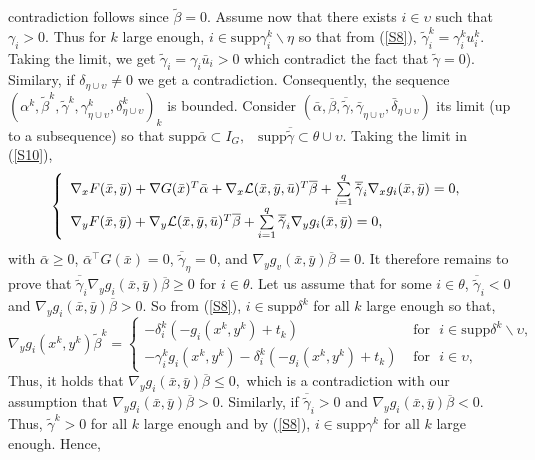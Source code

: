 	contradiction follows since $\tilde{\beta}=0$. Assume now that there
	exists $i\in\upsilon$ such that $\gamma_{i}>0.$ Thus for $k$ large enough,
	$i\in\mathrm{supp}\gamma_{i}^{k}\backslash\eta$ so that from (\ref{S8}),
	$\tilde{\gamma}_{i}^{k}= \gamma_{i}^{k}u_{i}^{k}$.  Taking the limit, we get $\tilde{\gamma}_{i}=\gamma _{i}\bar{u}_{i} > 0$  which contradict the fact that  $\tilde{\gamma}=0$).
	Similary, if
	$\delta_{\eta\cup\upsilon}\neq0$ we get a contradiction.
	Consequently, the sequence $(
	\alpha^{k},\tilde{\beta}^{k},\tilde{\gamma}^{k},\gamma
	_{\eta\cup\upsilon}^{k},\delta
	_{\eta\cup\upsilon}^{k})_{k}$ is bounded.
	Consider $(\bar{\alpha},\overline{\beta},\overline{\tilde{\gamma}},\bar{\gamma}_{\eta\cup\upsilon},\bar{\delta}_{\eta\cup\upsilon})$ its limit (up to a
	subsequence) so that 
	$
	\mathrm{supp}\bar{\alpha}\subset I_{G},\text{ }\, \mathrm{supp}\overline{\tilde{\gamma}
	}\subset\theta\cup\upsilon.
	$
	Taking the limit in (\ref{S10}), 
	\[
	\left\{
	\begin{array}{l}
	\nabla_{x}F(\bar{x},\bar{y})+\nabla G(\bar{x})^{T}\bar{\alpha}+\nabla
	_{x}\mathcal{L}(\bar{x},\bar{y},\bar{u})^{T}\overline{\beta}+\sum
	\limits_{i=1}^{q}\overline{\tilde{\gamma}}_{i}\nabla_{x}g_{i}(\bar{x},\bar
	{y})=0,\\[1ex]
	\multicolumn{1}{l}{\nabla_{y}F(\bar{x},\bar{y})+\nabla_{y}\mathcal{L}(\bar
		{x},\bar{y},\bar{u})^{T}\overline{\beta}+\sum\limits_{i=1}^{q}\overline
		{\tilde{\gamma}}_{i}\nabla_{y}g_{i}(\bar{x},\bar{y})=0,}
	\end{array}
	\right.
	\]
	with $\bar{\alpha}\geq0$, $\bar{\alpha}^\top G(\bar{x})=0$, $\overline{\tilde{\gamma}}_{\eta}=0$, and $\nabla_{y}g_{v}(\bar
	{x},\bar{y})\overline{\beta}=0$. 	
	It therefore remains to prove that $\overline{\tilde{\gamma}}_{i}\nabla_{y}g_{i}(\bar
	{x},\bar{y})\overline{\beta}\geq0$ for $i\in\theta.$ Let us assume that for
	some $i\in\theta$,
	$\overline{\tilde{\gamma}}_{i}<0$ and $\nabla_{y}g_{i} (\bar{x},\bar{y})\overline{\beta}>0.$
	So from (\ref{S8}), $i\in\mathrm{supp}\delta^{k}$ for all $k$
	large enough so that,
	\begin{equation}
	\nabla_{y}g_{i}(x^{k},y^{k})\tilde{\beta}^{k}=\left\{
	\begin{array}{lll}
	
	-\delta _{i}^{k}(-g_{i}(x^{k},y^{k})+t_{k})& \mbox{ for }\,\, i\in\mathrm{supp}\delta^{k}\backslash\upsilon,& \\
	-\gamma
	_{i}^{k}g_{i}(x^{k},y^{k})-\delta _{i}^{k}(-g_{i}(x^{k},y^{k})+t_{k})  & \mbox{ for }\,\,  i\in \upsilon,&
	\end{array}
	\right.
	\end{equation}
		Thus, it holds that
	$
	\nabla_{y}g_{i}(\bar{x},\bar{y})\overline{\beta} \leq0,
	$
	which is a contradiction with our assumption that $\nabla
	_{y}g_{i}(\bar{x},\bar{y})\overline{\beta}>0.$ Similarly, if $\overline
	{\tilde{\gamma}}_{i}>0$ and $\nabla_{y}g_{i}(\bar{x},\bar{y})\overline{\beta
	}<0.$ Thus, $\tilde{\gamma}^{k}>0$ for all $k$ large enough and by (\ref{S8}),
	$i\in\mathrm{supp}\gamma^{k}$ for all $k $ large enough. Hence,
	
